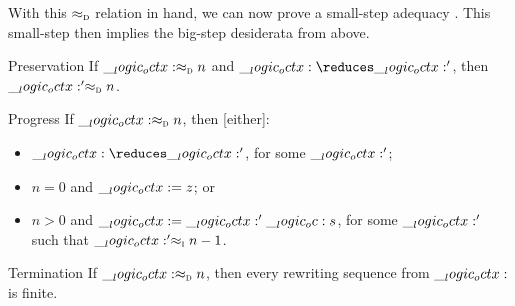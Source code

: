 
%







With this $ \approx\sb{\text{\normalfont\scshape d}} $ relation in hand, we can now prove a small-step adequacy .
This small-step  then implies the big-step desiderata from above.
%
\begin{theorem}\label{thm:string-rewriting:dec-small-step-adequacy}
  \leavevmode
  \begin{thmdescription}
  \item[Preservation]
    If $\__logic_octx: \approx\sb{\text{\normalfont\scshape d}} n$ and $\octx \reduces \octx'$, then $\__logic_octx:' \approx\sb{\text{\normalfont\scshape d}} n$.
  \item[Progress]
    If $\__logic_octx: \approx\sb{\text{\normalfont\scshape d}} n$, then [either]:
    \begin{itemize}[nosep]
    \item $\octx \reduces \octx'$, for some $\__logic_octx:'$;
    \item $n = 0$ and $\__logic_octx: = z$; or
    \item $n > 0$ and $\__logic_octx: = \__logic_octx:' \__logic_oc: s$, for some $\__logic_octx:'$ such that $\__logic_octx:' \approx\sb{\text{\normalfont\scshape i}} n-1$.
    \end{itemize}
  \item[Termination]
    If $\__logic_octx: \approx\sb{\text{\normalfont\scshape d}} n$, then every rewriting sequence from $\__logic_octx:$ is finite.
  \end{thmdescription}
\end{theorem}
